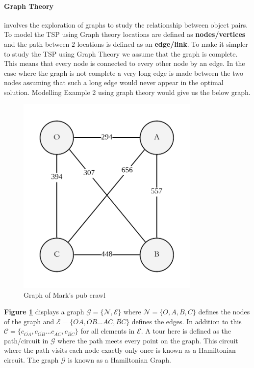 \documentclass[a4paper]{article}
\begin{document}
\paragraph{Graph Theory} involves the exploration of graphs to study the relationship between object pairs.\citep{4} To model the TSP using Graph theory locations are defined as \textbf{nodes/vertices} and the path between $2$ locations is defined as an \textbf{edge/link}. To make it simpler to study the TSP using Graph Theory we assume that the graph is complete. This means that every node is connected to every other node by an edge. In the case where the graph is not complete a very long edge is made between the two nodes assuming that such a long edge would never appear in the optimal solution. Modelling Example 2 using graph theory would give us the below graph.
\begin{figure}[H]
    \centering
        \includegraphics[width=90mm,scale=0.5]{images/PubCrawlGraph.png}
        \caption{Graph of Mark's pub crawl}
        \label{fig:markGraph}
\end{figure}
\textbf{Figure \ref{fig:markGraph}} displays a graph $\mathcal{G} = \{\mathcal{N},\mathcal{E}\}$ where $\mathcal{N} = \{O, A, B ,C \}$ defines the nodes of the graph and $\mathcal{E} = \{\overline{OA},\overline{OB}...\overline{AC},\overline{BC}\}$ defines the edges. In addition to this $\mathcal{C}=\{c_{\overline{OA}},c_{\overline{OB}}...c_{\overline{AC}}, c_{\overline{BC}} \}$ for all elements in $\mathcal{E}$. A tour here is defined as the path/circuit in $\mathcal{G}$ where the path meets every point on the graph. This circuit where the path visits each node exactly only once is known as a Hamiltonian circuit. The graph $\mathcal{G}$ is known as a Hamiltonian Graph.\\
\end{document}
